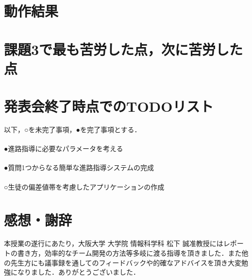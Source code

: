 \documentclass[a4j,titlepage]{jarticle}
\begin{document}
\section{動作結果}

\section{課題3で最も苦労した点，次に苦労した点}

\section{発表会終了時点でのTODOリスト}
以下，○を未完了事項，●を完了事項とする．\\
\\
●進路指導に必要なパラメータを考える\\
\\
●質問1つからなる簡単な進路指導システムの完成\\
\\
○生徒の偏差値帯を考慮したアプリケーションの作成\\

\section{感想・謝辞}
本授業の遂行にあたり，大阪大学 大学院 情報科学科 松下 誠准教授にはレポートの書き方，効率的なチーム開発の方法等多岐に渡る指導を頂きました．また他の先生方にも議事録を通してのフィードバックや的確なアドバイスを頂き大変勉強になりました．ありがとうございました．
\end{document}
